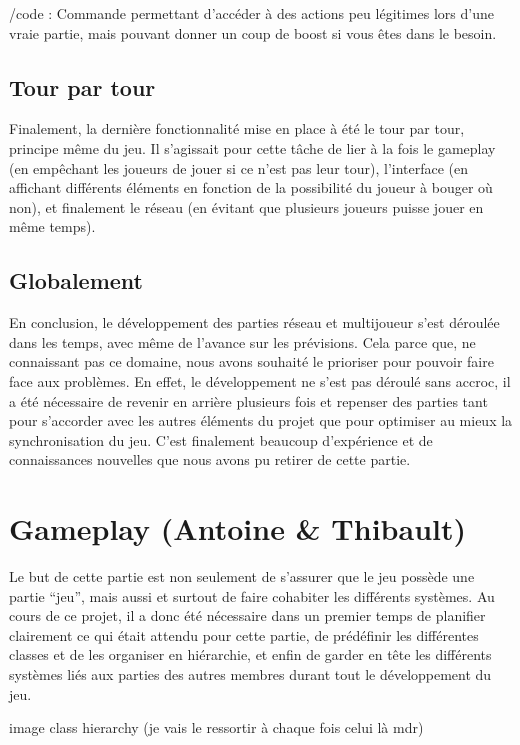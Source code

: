 \documentclass[12pt]{report}
\begin{document}
/code : Commande permettant d’accéder à des actions peu légitimes lors d’une
vraie partie, mais pouvant donner un coup de boost si vous êtes dans le besoin.

\subsection{Tour par tour}

Finalement, la dernière fonctionnalité mise en place à été le tour par tour,
principe même du jeu. Il s’agissait pour cette tâche de lier à la fois le
gameplay (en empêchant les joueurs de jouer si ce n’est pas leur tour),
l’interface (en affichant différents éléments en fonction de la possibilité du
joueur à bouger où non), et finalement le réseau (en évitant que plusieurs
joueurs puisse jouer en même temps).

\subsection{Globalement}

En conclusion, le développement des parties réseau et multijoueur s’est déroulée
dans les temps, avec même de l’avance sur les prévisions. Cela parce que, ne
connaissant pas ce domaine, nous avons souhaité le prioriser pour pouvoir faire
face aux problèmes. En effet, le développement ne s’est pas déroulé sans accroc,
il a été nécessaire de revenir en arrière plusieurs fois et repenser des parties
tant pour s’accorder avec les autres éléments du projet que pour optimiser au
mieux la synchronisation du jeu. C’est finalement beaucoup d’expérience et de
connaissances nouvelles que nous avons pu retirer de cette partie.

\section{Gameplay (Antoine \& Thibault)}

Le but de cette partie est non seulement de s’assurer que le jeu possède une
partie “jeu”, mais aussi et surtout de faire cohabiter les différents systèmes.
Au cours de ce projet, il a donc été nécessaire dans un premier temps de
planifier clairement ce qui était attendu pour cette partie, de prédéfinir les
différentes classes et de les organiser en hiérarchie, et enfin de garder en
tête les différents systèmes liés aux parties des autres membres durant tout le
développement du jeu.

image class hierarchy (je vais le ressortir à chaque fois celui là mdr)
\end{document}
